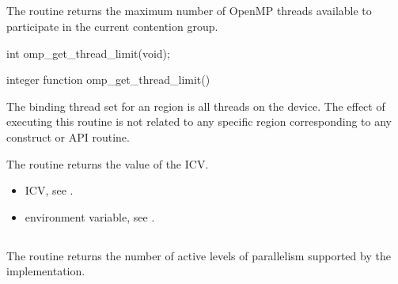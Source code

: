 \subsection{}
\label{subsec:omp_get_thread_limit}
\summary
The  routine returns the maximum number of OpenMP
threads available to participate in the current contention group.

\format
\begin{ccppspecific}
\begin{ompcFunction}
int omp_get_thread_limit(void);
\end{ompcFunction}
\end{ccppspecific}

\begin{fortranspecific}
\begin{ompfFunction}
integer function omp_get_thread_limit()
\end{ompfFunction}
\end{fortranspecific}

\binding
The binding thread set for an  region is all 
threads on the device. The effect of executing this routine is not related 
to any specific region corresponding to any construct or API routine.

\effect
The  routine returns the value of the 
 ICV.

\crossreferences
\begin{itemize}
\item {} ICV, see
.

\item {} environment variable, see
.
\end{itemize}



\subsection{}
\label{subsec:omp_get_supported_active_levels}

\summary
The  routine returns the
number of active levels of parallelism supported by the implementation.

